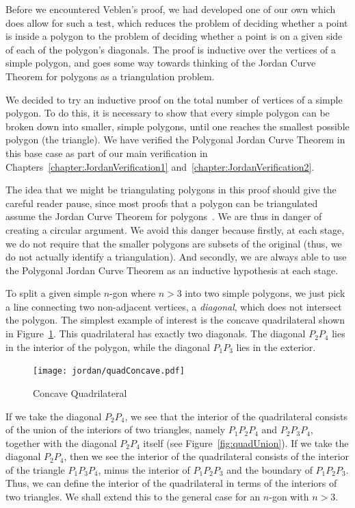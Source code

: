 Before we encountered Veblen's proof, we had developed one of our own which does allow for such a test, which reduces the problem of deciding whether a point is inside a polygon to the problem of deciding whether a point is on a given side of each of the polygon's diagonals. The proof is inductive over the vertices of a simple polygon, and goes some way towards thinking of the Jordan Curve Theorem for polygons as a triangulation problem.

We decided to try an inductive proof on the total number of vertices of a simple polygon. To do this, it is necessary to show that every simple polygon can be broken down into smaller, simple polygons, until one reaches the smallest possible polygon (the triangle). We have verified the Polygonal Jordan Curve Theorem in this base case as part of our main verification in Chapters~\ref{chapter:JordanVerification1} and~\ref{chapter:JordanVerification2}.

The idea that we might be triangulating polygons in this proof should give the careful reader pause, since most proofs that a polygon can be triangulated assume the Jordan Curve Theorem for polygons~\cite{PolygonsHaveEars}. We are thus in danger of creating a circular argument. We avoid this danger because firstly, at each stage, we do not require that the smaller polygons are subsets of the original (thus, we do not actually identify a triangulation). And secondly, we are always able to use the Polygonal Jordan Curve Theorem as an inductive hypothesis at each stage.

To split a given simple $n$-gon where $n>3$ into two simple polygons, we just pick a line connecting two non-adjacent vertices, a \emph{diagonal}, which does not intersect the polygon. The simplest example of interest is the concave quadrilateral shown in Figure~\ref{fig:quadConcave}. This quadrilateral has exactly two diagonals. The diagonal $P_2P_4$ lies in the interior of the polygon, while the diagonal $P_1P_3$ lies in the exterior.

\begin{figure}
  \centering
  \texttt{[image: jordan/quadConcave.pdf]}
  \caption{Concave Quadrilateral}
  \label{fig:quadConcave}
\end{figure}

If we take the diagonal $P_2P_4$, we see that the interior of the quadrilateral consists of the union of the interiors of two triangles, namely $P_1P_2P_4$ and $P_2P_3P_4$, together with the diagonal $P_2P_4$ itself (see Figure~\ref{fig:quadUnion}). If we take the diagonal $P_2P_4$, then we see the interior of the quadrilateral consists of the interior of the triangle $P_1P_3P_4$, minus the interior of $P_1P_2P_3$ and the boundary of $P_1P_2P_3$. Thus, we can define the interior of the quadrilateral in terms of the interiors of two triangles. We shall extend this to the general case for an $n$-gon with $n>3$.

